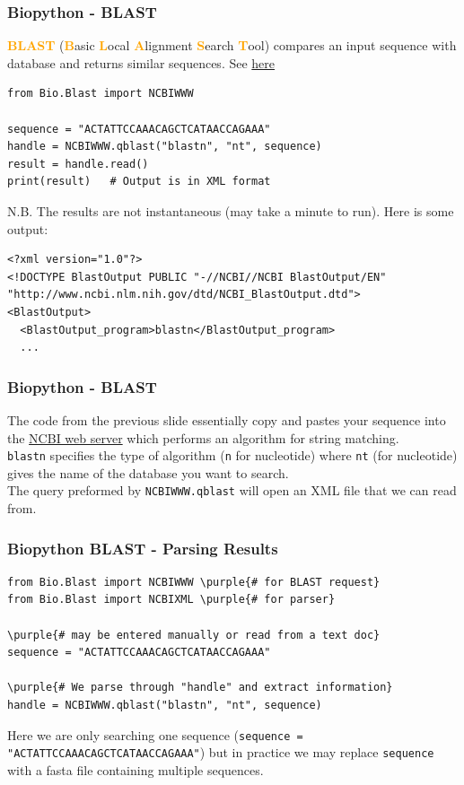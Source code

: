 \documentclass[xcolor=svgnames]{beamer}
\newcommand{\purple}[1]{{\textcolor{purple}{#1}}}
\newcommand{\nl}{\\[1em]}
\newcommand{\define}[1]{\textbf{\textcolor{orange}{#1}}}
\newcommand{\ft}[1]{\frametitle{#1}}
\begin{document}
\begin{frame}[fragile]\ft{Biopython - BLAST}
\define{BLAST} (\define Basic \define Local \define Alignment \define Search \define Tool) compares an input sequence with database and returns similar sequences. See \href{http://blast.ncbi.nlm.nih.gov/}{here} 
\begin{Verbatim}[xleftmargin=.1in, frame=single] 
from Bio.Blast import NCBIWWW

sequence = "ACTATTCCAAACAGCTCATAACCAGAAA"
handle = NCBIWWW.qblast("blastn", "nt", sequence)
result = handle.read()
print(result)	# Output is in XML format
\end{Verbatim}
N.B.  The results are not instantaneous (may take a minute to run). Here is some output:
\begin{Verbatim}[frame=single, fontsize=\small]
<?xml version="1.0"?>
<!DOCTYPE BlastOutput PUBLIC "-//NCBI//NCBI BlastOutput/EN" "http://www.ncbi.nlm.nih.gov/dtd/NCBI_BlastOutput.dtd">
<BlastOutput>
  <BlastOutput_program>blastn</BlastOutput_program>
  ...
\end{Verbatim}

\end{frame}

\begin{frame}[fragile]\ft{Biopython - BLAST}
The  code from the previous slide essentially copy and pastes your sequence into the \href{https://blast.ncbi.nlm.nih.gov/Blast.cgi?PROGRAM=blastn&PAGE_TYPE=BlastSearch&LINK_LOC=blasthome}{NCBI web server} which  performs an algorithm for string matching.\nl
{\tt blastn} specifies the type of algorithm ({\tt n} for nucleotide) where {\tt nt}  (for nucleotide) gives the name of the database you want to search.\nl 

The query preformed by {\tt NCBIWWW.qblast} will open an XML  file that we can read from.\nl



\end{frame}


\begin{frame}[fragile]\ft{Biopython BLAST - Parsing Results}\label{intblast}
%
\begin{Verbatim}[xleftmargin=.1in, commandchars=\\\{\}, frame=single] 
from Bio.Blast import NCBIWWW \purple{# for BLAST request}
from Bio.Blast import NCBIXML \purple{# for parser}

\purple{# may be entered manually or read from a text doc}
sequence = "ACTATTCCAAACAGCTCATAACCAGAAA"

\purple{# We parse through "handle" and extract information}
handle = NCBIWWW.qblast("blastn", "nt", sequence)
\end{Verbatim}
Here we are only searching one sequence ({\tt sequence = "ACTATTCCAAACAGCTCATAACCAGAAA"}) but in practice we may replace {\tt sequence} with a fasta file containing multiple sequences. 
\end{frame}
\end{document}
